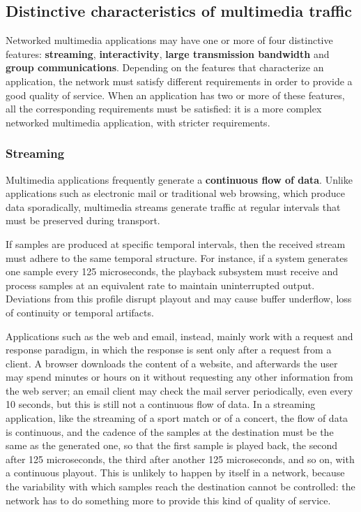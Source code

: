 \subsection{Distinctive characteristics of multimedia traffic}
Networked multimedia applications may have one or more of four distinctive features: \textbf{streaming}, \textbf{interactivity}, \textbf{large transmission bandwidth} and \textbf{group communications}. Depending on the features that characterize an application, the network must satisfy different requirements in order to provide a good quality of service. When an application has two or more of these features, all the corresponding requirements must be satisfied: it is a more complex networked multimedia application, with stricter requirements.

\subsubsection*{Streaming}

Multimedia applications frequently generate a \textbf{continuous flow of data}. Unlike applications such as electronic mail or traditional web browsing, which produce data sporadically, multimedia streams generate traffic at regular intervals that must be preserved during transport.

If samples are produced at specific temporal intervals, then the received stream must adhere to the same temporal structure. For instance, if a system generates one sample every 125 microseconds, the playback subsystem must receive and process samples at an equivalent rate to maintain uninterrupted output. Deviations from this profile disrupt playout and may cause buffer underflow, loss of continuity or temporal artifacts.

Applications such as the web and email, instead, mainly work with a request and response paradigm, in which the response is sent only after a request from a client. A browser downloads the content of a website, and afterwards the user may spend minutes or hours on it without requesting any other information from the web server; an email client may check the mail server periodically, even every 10 seconds, but this is still not a continuous flow of data. In a streaming application, like the streaming of a sport match or of a concert, the flow of data is continuous, and the cadence of the samples at the destination must be the same as the generated one, so that the first sample is played back, the second after 125 microseconds, the third after another 125 microseconds, and so on, with a continuous playout. This is unlikely to happen by itself in a network, because the variability with which samples reach the destination cannot be controlled: the network has to do something more to provide this kind of quality of service.

